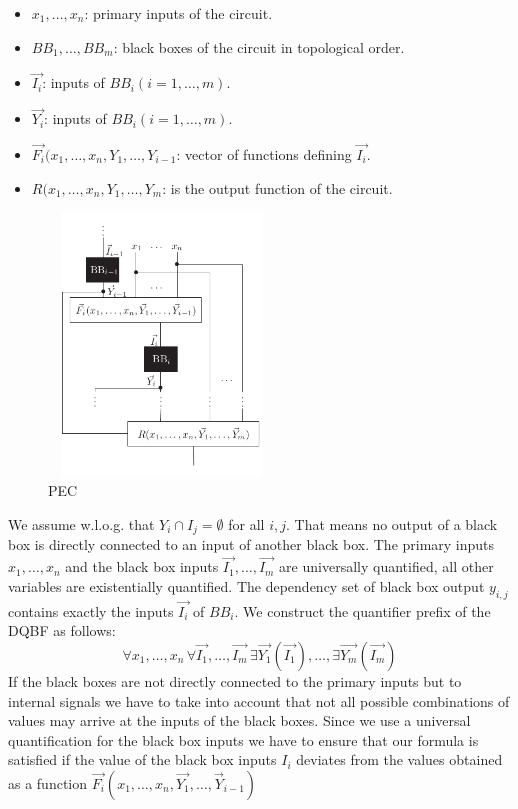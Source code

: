 \documentclass[runningheads]{llncs}
\begin{document}
\begin{itemize}
\item $x_1,\dots,x_n$: primary inputs of the circuit.
\item $BB_1 ,\dots, BB_m$: black boxes of the circuit in topological order.
\item $\overrightarrow{I_i}$: inputs of $BB_i (i = 1,\dots, m)$.
\item $\overrightarrow{Y_i}$: inputs of $BB_i (i = 1,\dots, m)$.
\item $\overrightarrow{F_i}(x_1,\dots, x_n, Y_1,\dots,Y_{i-1}$: vector of functions defining $\overrightarrow{I_i}$.
\item $R(x_1,\dots, x_n, Y_1,\dots,Y_{m}$: is the output function of the circuit.
\end{itemize}
\begin{figure}[]
	\includegraphics[width=6cm, height=7cm]{not}
	\centering
	\caption{PEC}\label{fig:notation}
\end{figure}

We assume w.l.o.g. that $Y_i \cap I_j = \emptyset$  for all $i,j$. That means no output of a black box is directly connected to an input of another black box.
The primary inputs $x_1 ,\dots, x_n$ and the black box inputs $\overrightarrow{I_1},\dots,\overrightarrow{I_m}$ are universally quantified, all other variables are existentially
quantified.
The dependency set of black box output $y_{i,j}$ contains exactly the inputs $\overrightarrow{I_i}$ of $BB_i$.
We construct the quantifier prefix of the DQBF as follows:
\[
\forall x_1,\dots,x_n \, \forall \overrightarrow{I_1},\dots,\overrightarrow{I_m} \, \exists \overrightarrow{Y_1}(\overrightarrow{I_1}),\dots, \exists \overrightarrow{Y_m}(\overrightarrow{I_m})
\]
If the black boxes are not directly connected to the primary inputs but to internal signals we have to take into account that not all possible combinations of values may arrive at the inputs of the black boxes.
Since we use a universal quantification for the black box inputs we have to ensure that our formula is satisfied if the value of the black box inputs $I_i$ deviates from the values
obtained as a function $\overrightarrow{F_i} (x_1 ,\dots, x_n,\overrightarrow{Y_1} ,\dots ,\overrightarrow{Y}_{i-1} )$
\end{document}
